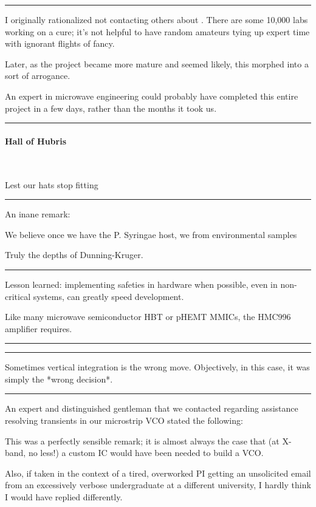 \documentclass[paper.tex]{subfiles}
\begin{document}
\rule{\linewidth}{0.2pt}

I originally rationalized not contacting others about . There are some 10,000 labs working on a cure; it's not helpful to have random amateurs tying up expert time with ignorant flights of fancy. 

Later, as the project became more mature and seemed likely, this morphed into a sort of arrogance.

An expert in microwave engineering could probably have completed this entire project in a few days, rather than the months it took us.

\rule{\linewidth}{0.2pt}

\paragraph{Hall of Hubris} \

Lest our hats stop fitting

\rule{\linewidth}{0.2pt}

An inane remark:

\begin{displayquote}
We believe once we have the P. Syringae host, we from environmental samples
\end{displayquote}

Truly the depths of Dunning-Kruger.

\rule{\linewidth}{0.2pt}


Lesson learned: implementing safeties in hardware when possible, even in non-critical systems, can greatly speed development.

Like many microwave semiconductor HBT or pHEMT MMICs, the HMC996 amplifier requires.

\rule{\linewidth}{0.2pt}


\rule{\linewidth}{0.2pt}

Sometimes vertical integration is the wrong move. Objectively, in this case, it was simply the *wrong decision*. 

\rule{\linewidth}{0.2pt}


An expert and distinguished gentleman that we contacted regarding assistance resolving transients in our microstrip VCO stated the following:



This was a perfectly sensible remark; it is almost always the case that (at X-band, no less!) a custom IC would have been needed to build a VCO.

Also, if taken in the context of a tired, overworked PI getting an unsolicited email from an excessively verbose undergraduate at a different university, I hardly think I would have replied differently.
\end{document}
